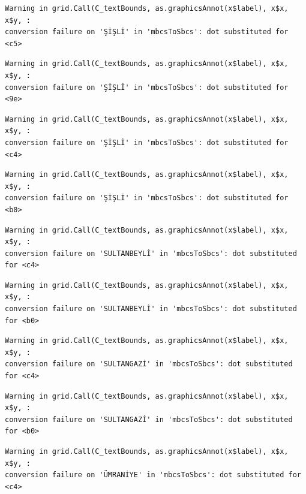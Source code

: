 \documentclass[
  11pt,
  a4paper,
  DIV=11,
  numbers=noendperiod]{scrartcl}
\begin{document}
\begin{verbatim}
Warning in grid.Call(C_textBounds, as.graphicsAnnot(x$label), x$x, x$y, :
conversion failure on 'ŞİŞLİ' in 'mbcsToSbcs': dot substituted for <c5>
\end{verbatim}

\begin{verbatim}
Warning in grid.Call(C_textBounds, as.graphicsAnnot(x$label), x$x, x$y, :
conversion failure on 'ŞİŞLİ' in 'mbcsToSbcs': dot substituted for <9e>
\end{verbatim}

\begin{verbatim}
Warning in grid.Call(C_textBounds, as.graphicsAnnot(x$label), x$x, x$y, :
conversion failure on 'ŞİŞLİ' in 'mbcsToSbcs': dot substituted for <c4>
\end{verbatim}

\begin{verbatim}
Warning in grid.Call(C_textBounds, as.graphicsAnnot(x$label), x$x, x$y, :
conversion failure on 'ŞİŞLİ' in 'mbcsToSbcs': dot substituted for <b0>
\end{verbatim}

\begin{verbatim}
Warning in grid.Call(C_textBounds, as.graphicsAnnot(x$label), x$x, x$y, :
conversion failure on 'SULTANBEYLİ' in 'mbcsToSbcs': dot substituted for <c4>
\end{verbatim}

\begin{verbatim}
Warning in grid.Call(C_textBounds, as.graphicsAnnot(x$label), x$x, x$y, :
conversion failure on 'SULTANBEYLİ' in 'mbcsToSbcs': dot substituted for <b0>
\end{verbatim}

\begin{verbatim}
Warning in grid.Call(C_textBounds, as.graphicsAnnot(x$label), x$x, x$y, :
conversion failure on 'SULTANGAZİ' in 'mbcsToSbcs': dot substituted for <c4>
\end{verbatim}

\begin{verbatim}
Warning in grid.Call(C_textBounds, as.graphicsAnnot(x$label), x$x, x$y, :
conversion failure on 'SULTANGAZİ' in 'mbcsToSbcs': dot substituted for <b0>
\end{verbatim}

\begin{verbatim}
Warning in grid.Call(C_textBounds, as.graphicsAnnot(x$label), x$x, x$y, :
conversion failure on 'ÜMRANİYE' in 'mbcsToSbcs': dot substituted for <c4>
\end{verbatim}
\end{document}
